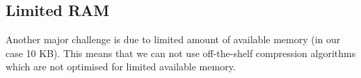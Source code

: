 \documentclass[conference]{IEEEtran}
\begin{document}
\subsection{Limited RAM}
Another major challenge is due to limited amount of available memory (in our case 10 KB). This means that we can not use off-the-shelf compression algorithms which are not optimised for limited available memory.
%
%
\end{document}
